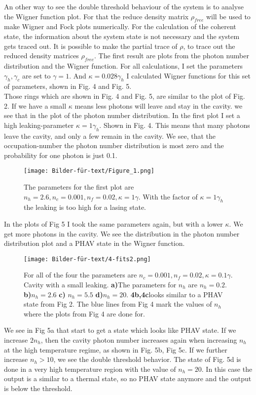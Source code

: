 \documentclass[12pt,a4paper]{article}
\begin{document}
\newpage
An other way to see the double threshold behaviour of the system is to analyse the Wigner function plot. For that the reduce density matrix $\rho_{free}$ will be used to make Wigner and Fock plots numerically. For the calculation of the coherent state, the information about the system state is not necessary and the system gets traced out. 
It is possible to make the partial trace of $\rho$, to trace out the reduced density matrices $\rho_{free}$. 
The first result are plots from the photon number distribution and the Wigner function.
 For all calculations, I set the parameters $\gamma_h, \gamma_c $ are set to $\gamma=1$. And $\kappa=0.028 \gamma_h$
I calculated Wigner functions for this set of parameters, shown in Fig. 4 and Fig. 5.\\
Those rings which are shown in Fig. 4 and Fig. 5, are similar to the plot of Fig. 2.
If we have a small $\kappa$ means less photons will leave and stay in the cavity. we see that in the plot of the photon number distribution.
In the first plot I set a high leaking-parameter $\kappa=1 \gamma_h$. Shown in Fig. 4.
This means that many photons leave the cavity, and only a few remain in the cavity. 
We see, that the occupation-number the photon number distribution is most zero and the probability for one photon is just 0.1.

\begin{figure}[hbtp]
\centering
\texttt{[image: Bilder-für-text/Figure\_1.png]}
\caption{The parameters for the first plot are $n_h=2.6, n_c=0.001, n_f=0.02, \kappa=1\gamma $. With  the factor of $\kappa=1\gamma_h$ the leaking is too high for a lasing state.}
\end{figure}\newpage

In the plots of Fig 5 I took the same parameters again, but with a lower $\kappa$. We get more photons in the cavity. We see the distribution in the photon number distribution plot and a PHAV state in the Wigner function. 
\begin{figure}[h!]
\centering
\texttt{[image: Bilder-für-text/4-fits2.png]}
\caption{For all of the four the parameters are $n_c=0.001, n_f=0.02, \kappa=0.1\gamma$. Cavity with a small leaking.
\textbf{a)}The parameters for $n_h$ are $n_h=0.2 $.
\textbf{b)}$ n_h=2.6$ 
\textbf{c)} $ n_h=5.5$ 
\textbf{d)}$ n_h=20$. 
\textbf{4b,4c}looks similar to a PHAV state from Fig 2. The blue lines from Fig 4 mark the values of $n_h$ where the plots from Fig 4 are done for. }
\end{figure}
\newpage
We see in Fig 5a that start to get a state which looks like PHAV state.
If we increase  $2n_h $,
then the cavity photon number increases again when increasing $n_h$ at the
high temperature regime, as shown in Fig. 5b, Fig 5c. 
If we further increase  $n_h >10$, we see the double threshold behavior. 
The state of Fig. 5d is done in a very high temperature region with the value of $n_h=20$. In this  case the output is a similar to a thermal state, so no PHAV state anymore and the output is below the threshold.
\end{document}
